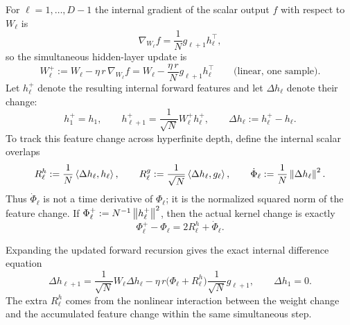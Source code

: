 For $\ell = 1, \dots, D - 1$ the internal gradient of the scalar output $f$ with respect to $W_\ell$ is
\begin{equation}
\label{eq:ch6-grad-W}
\nabla_{W_\ell} f = \frac{1}{N} g_{\ell+1} h_\ell^\top,
\end{equation}
so the simultaneous hidden-layer update is
\begin{equation}
\label{eq:ch6-W-plus}
W_\ell^+ := W_\ell - \eta\,r\,\nabla_{W_\ell} f = W_\ell - \frac{\eta\,r}{N} g_{\ell+1} h_\ell^\top \qquad \text{(linear, one sample)}.
\end{equation}
Let $h_\ell^+$ denote the resulting internal forward features and let $\Delta h_\ell$ denote their change:
\begin{equation}
\label{eq:ch6-h-plus}
h_1^+ = h_1, \qquad
h_{\ell+1}^+ = \frac{1}{\sqrt{N}} W_\ell^+ h_\ell^+, \qquad
\Delta h_\ell := h_\ell^+ - h_\ell.
\end{equation}
To track this feature change across hyperfinite depth, define the internal scalar overlaps
\begin{equation}
\label{eq:ch6-overlaps-def}
R_\ell^h := \frac{1}{N}\left\langle \Delta h_\ell, h_\ell \right\rangle, \qquad
R_\ell^g := \frac{1}{\sqrt{N}}\left\langle \Delta h_\ell, g_\ell \right\rangle, \qquad
\dot{\Phi}_\ell := \frac{1}{N}\left\lVert \Delta h_\ell \right\rVert^2.
\end{equation}
Thus $\dot{\Phi}_\ell$ is not a time derivative of $\Phi_\ell$; it is the normalized squared norm of the feature change. If $\Phi_\ell^+ := N^{-1}\left\lVert h_\ell^+ \right\rVert^2$, then the actual kernel change is exactly
\begin{equation}
\label{eq:ch6-kernel-change}
\Phi_\ell^+ - \Phi_\ell = 2 R_\ell^h + \dot{\Phi}_\ell.
\end{equation}

Expanding the updated forward recursion gives the exact internal difference equation
\begin{equation}
\label{eq:ch6-delta-h-rec}
\Delta h_{\ell+1} = \frac{1}{\sqrt{N}} W_\ell \Delta h_\ell - \eta\,r\bigl(\Phi_\ell + R_\ell^h\bigr)\frac{1}{\sqrt{N}} g_{\ell+1}, \qquad
\Delta h_1 = 0.
\end{equation}
The extra $R_\ell^h$ comes from the nonlinear interaction between the weight change and the accumulated feature change within the same simultaneous step.

